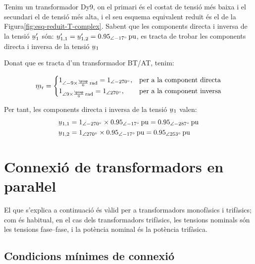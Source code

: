 \begin{exemple}
Tenim un transformador Dy9, on el primari és el costat de tensió més baixa  i el secundari el de tensió més alta, i el seu esquema equivalent reduït és el de la Figura\vref{fig:esq-reduit-T-complex}. Sabent que les components directa i inversa de la tensió $\cmplx{u}'_1$ són:
$\cmplx{u}'_{1,1}= \cmplx{u}'_{1,2} = \SIpd{0,95}{-17}{pu}$, es tracta de trobar les components directa i inversa de la tensió $\cmplx{u}_1$

    Donat que es tracta d'un transformador BT/AT, tenim:

    \[
    \cmplx{m}\ped{r} = \begin{cases}
      1_{\angle -9\times\frac{\piup}{6}\unit{rad}} = \numpd{1}{-270}, & \text{per a la component directa}\\
      1_{\angle 9\times\frac{\piup}{6}\unit{rad}} = \numpd{1}{ 270}, & \text{per a la component inversa}
    \end{cases}
    \]

     Per tant, les components directa i inversa de la tensió  $\cmplx{u}_1$ valen:
    \begin{align*}
    \cmplx{u}_{1,1} &= \numpd{1}{-270}\times \SIpd{0,95}{-17}{pu}  = \SIpd{0,95}{-287}{pu} \\
    \cmplx{u}_{1,2} &= \numpd{1}{ 270}\times \SIpd{0,95}{-17}{pu}  = \SIpd{0,95}{253}{pu}
    \end{align*}
\end{exemple}



\section{\texorpdfstring{Connexió de transformadors en paraŀlel}{Connexió de transformadors en paral-lel}}

El que s'explica a continuació és vàlid per a transformadors
monofàsics i trifàsics; com és habitual, en el cas dels
transformadors trifàsics, les tensions nominals són les tensions
fase--fase, i la potència nominal és la potència trifàsica.

\subsection{Condicions mínimes de connexió}

